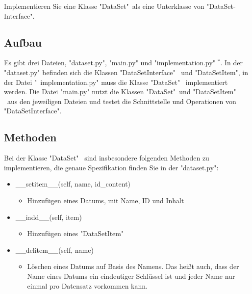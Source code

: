 \documentclass{article}
\begin{document}
Implementieren Sie eine Klasse "DataSet"\ als eine Unterklasse von "DataSet-
Interface".		
\subsection{Aufbau}	
Es gibt drei Dateien, "dataset.py", "main.py" und "implementation.py" $^*$. In der
"dataset.py" befinden sich die Klassen "DataSetInterface" \ und "DataSetItem",
in der Datei "\ implementation.py" muss die Klasse "DataSet" \ implementiert
werden. Die Datei "main.py" nutzt die Klassen "DataSet"\ und "DataSetItem" \
aus den jeweiligen Dateien und testet die Schnittstelle und Operationen von
"DataSetInterface".	

\subsection{Methoden}
Bei der Klasse "DataSet" \ sind insbesondere folgenden Methoden zu implementieren, die genaue Spezifikation finden Sie in der "dataset.py":

\begin{itemize}
\item \_\_setitem\_\_(self, name, id\_content)
	\begin{itemize}
		\item[]	Hinzufügen eines Datums, mit Name, ID und Inhalt
	\end{itemize}

\end{itemize}

\begin{itemize}
	\item \_\_iadd\_\_(self, item)
	\begin{itemize}
		\item[]	Hinzufügen eines "DataSetItem"
	\end{itemize}
	
\end{itemize}

\begin{itemize}
	\item \_\_delitem\_\_(self, name)
	\begin{itemize}
		\item[]	Löschen eines Datums auf Basis des Namens.
		Das heißt auch, dass der Name eines Datums ein eindeutiger Schlüssel
		ist und jeder Name nur einmal pro Datensatz vorkommen kann.
	\end{itemize}
\end{itemize}
\end{document}
